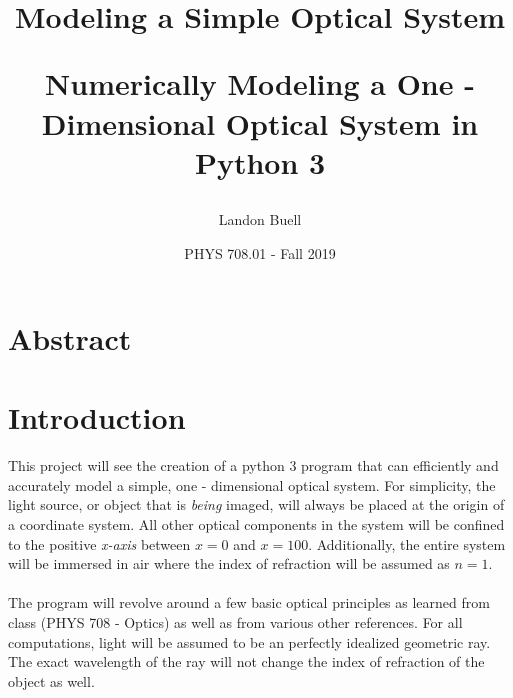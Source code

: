 \documentclass[12pt,letterpaper]{article}
\begin{document}

\title{
\begin{Huge}
Modeling a Simple Optical System\\
\end{Huge}
\vspace*{5mm}
\Large Numerically Modeling a One - Dimensional Optical System in Python 3}
\author{Landon Buell}
\date{PHYS 708.01 - Fall 2019}
\maketitle



\section{Abstract}


\section{Introduction}
\paragraph*{}This project will see the creation of a python 3 program that can efficiently and accurately model a simple, one - dimensional optical system. For simplicity, the light source, or object that is \textit{being} imaged, will always be placed at the origin of a coordinate system. All other optical components in the system will be confined to the positive \textit{x-axis} between $x = 0$ and $x = 100$. Additionally, the entire system will be immersed in air where the index of refraction will be assumed as $n=1$.
\paragraph*{}The program will revolve around a few basic optical principles as learned from class (PHYS 708 - Optics) as well as from various other references. For all computations, light will be assumed to be an perfectly idealized geometric ray. The exact wavelength of the ray will not change the index of refraction of the object as well.

\end{document}
